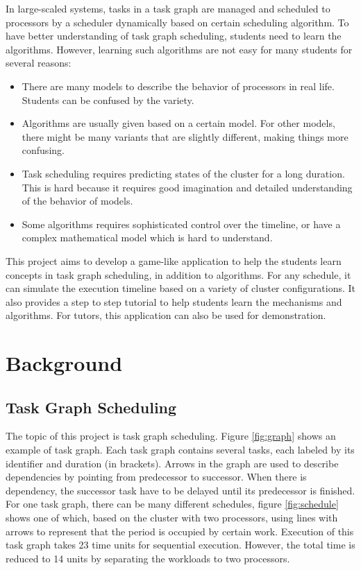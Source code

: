 \documentclass[msc,deptreport, cs]{infthesis}
\begin{document}
In large-scaled systems, tasks in a task graph are managed and scheduled to processors by a scheduler dynamically based on certain scheduling algorithm. To have better understanding of task graph scheduling, students need to learn the algorithms. However, learning such algorithms are not easy for many students for several reasons:

\begin{itemize}
  \item There are many models to describe the behavior of processors in real life. Students can be confused by the variety.
  \item Algorithms are usually given based on a certain model. For other models, there might be many variants that are slightly different, making things more confusing.
  \item Task scheduling requires predicting states of the cluster for a long duration. This is hard because it requires good imagination and detailed understanding of the behavior of models.
  \item Some algorithms requires sophisticated control over the timeline, or have a complex mathematical model which is hard to understand.
\end{itemize}

This project aims to develop a game-like application to help the students learn concepts in task graph scheduling, in addition to algorithms. For any schedule, it can simulate the execution timeline based on a variety of cluster configurations. It also provides a step to step tutorial to help students learn the mechanisms and algorithms. For tutors, this application can also be used for demonstration.

\chapter{Background}

\section{Task Graph Scheduling} \label{sec:comm}

The topic of this project is task graph scheduling. Figure \ref{fig:graph} shows an example of task graph. Each task graph contains several tasks, each labeled by its identifier and duration (in brackets). Arrows in the graph are used to describe dependencies by pointing from predecessor to successor. When there is dependency, the successor task have to be delayed until its predecessor is finished. For one task graph, there can be many different schedules, figure \ref{fig:schedule} shows one of which, based on the cluster with two processors, using lines with arrows to represent that the period is occupied by certain work. Execution of this task graph takes 23 time units for sequential execution. However, the total time is reduced to 14 units by separating the workloads to two processors.
\end{document}
